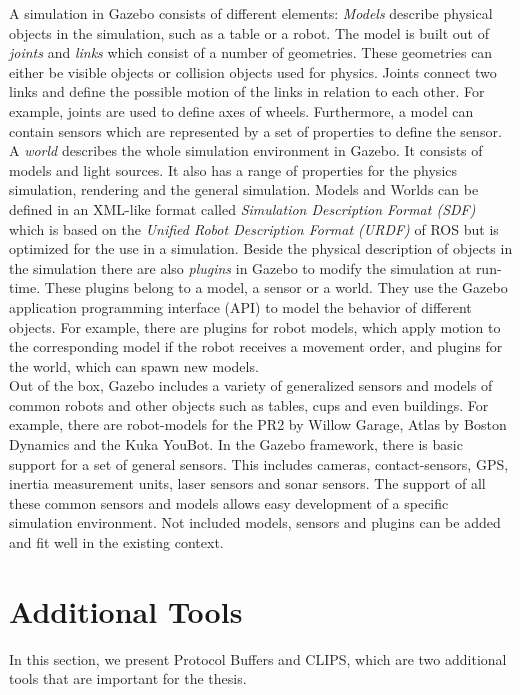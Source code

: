 A simulation in Gazebo consists of different elements: \textit{Models} describe physical objects in the simulation, such as a table or a robot. The model is built out of \textit{joints} and \textit{links} which consist of a number of geometries. These geometries can either be visible objects or collision objects used for physics. Joints connect two links and define the possible motion of the links in relation to each other. For example, joints are used to define axes of wheels. Furthermore, a model can contain sensors which are represented by a set of properties to define the sensor. A \textit{world} describes the whole simulation environment in Gazebo. It consists of models and light sources. It also has a range of properties for the physics simulation, rendering and the general simulation. Models and Worlds can be defined in an XML-like format called \textit{Simulation Description Format (SDF)} which is based on the \textit{Unified Robot Description Format (URDF)} of ROS but is optimized for the use in a simulation. Beside the physical description of objects in the simulation there are also \textit{plugins} in Gazebo to modify the simulation at run-time. These plugins belong to a model, a sensor or a world. They use the Gazebo application programming interface (API) to model the behavior of different objects. For example, there are plugins for robot models, which apply motion to the corresponding model if the robot receives a movement order, and plugins for the world, which can spawn new models.\\
Out of the box, Gazebo includes a variety of generalized sensors and models of common robots and other objects such as tables, cups and even buildings. For example, there are robot-models for the PR2 by Willow Garage, Atlas by Boston Dynamics and the Kuka YouBot. In the Gazebo framework, there is basic support for a set of general sensors. This includes cameras, contact-sensors, GPS, inertia measurement units, laser sensors and sonar sensors. The support of all these common sensors and models allows easy development of a specific simulation environment. Not included models, sensors and plugins can be added and fit well in the existing context.\\


\section{Additional Tools}
\label{sec:additional_software}
In this section, we present Protocol Buffers and CLIPS, which are two additional tools that are important for the thesis.

